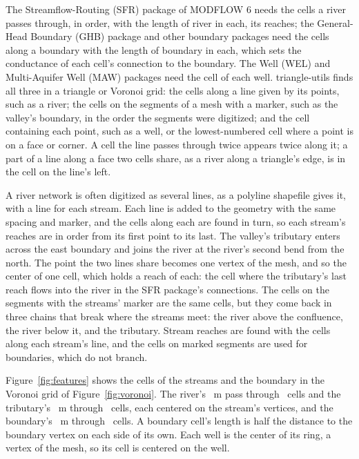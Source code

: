 \documentclass[11pt,twoside,twocolumn]{usgsreport}
\begin{document}
The Streamflow-Routing (SFR) package of MODFLOW 6 needs the cells a river passes through, in order, with the length of river in each, its reaches; the General-Head Boundary (GHB) package and other boundary packages need the cells along a boundary with the length of boundary in each, which sets the conductance of each cell's connection to the boundary. The Well (WEL) and Multi-Aquifer Well (MAW) packages need the cell of each well. triangle-utils finds all three in a triangle or Voronoi grid: the cells along a line given by its points, such as a river; the cells on the segments of a mesh with a marker, such as the valley's boundary, in the order the segments were digitized; and the cell containing each point, such as a well, or the lowest-numbered cell where a point is on a face or corner. A cell the line passes through twice appears twice along it; a part of a line along a face two cells share, as a river along a triangle's edge, is in the cell on the line's left.

A river network is often digitized as several lines, as a polyline shapefile gives it, with a line for each stream. Each line is added to the geometry with the same spacing and marker, and the cells along each are found in turn, so each stream's reaches are in order from its first point to its last. The valley's tributary enters across the east boundary and joins the river at the river's second bend from the north. The point the two lines share becomes one vertex of the mesh, and so the center of one cell, which holds a reach of each: the cell where the tributary's last reach flows into the river in the SFR package's connections. The cells on the segments with the streams' marker are the same cells, but they come back in three chains that break where the streams meet: the river above the confluence, the river below it, and the tributary. Stream reaches are found with the cells along each stream's line, and the cells on marked segments are used for boundaries, which do not branch.

Figure~\ref{fig:features} shows the cells of the streams and the boundary in the Voronoi grid of Figure~\ref{fig:voronoi}. The river's \riverlength~m pass through \rivercells\ cells and the tributary's \tributarylength~m through \tributarycells\ cells, each centered on the stream's vertices, and the boundary's \boundarylength~m through \boundarycells\ cells. A boundary cell's length is half the distance to the boundary vertex on each side of its own. Each well is the center of its ring, a vertex of the mesh, so its cell is centered on the well.
\end{document}
